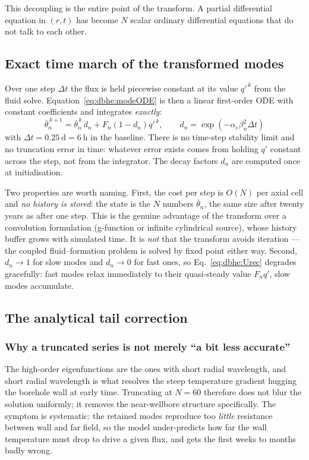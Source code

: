 \documentclass[11pt]{article}
\begin{document}
This decoupling is the entire point of the transform. A partial differential
equation in $(r,t)$ has become $N$ scalar ordinary differential equations that
do not talk to each other.

\subsection{Exact time march of the transformed modes}
\label{sec:dbhe:march}

Over one step $\Delta t$ the flux is held piecewise constant at its value
$q'^{\,k}$ from the fluid solve. Equation~\eqref{eq:dbhe:modeODE} is then a
linear first-order ODE with constant coefficients and integrates \emph{exactly}:
\begin{equation}
\boxed{\; \bar\theta_n^{\,k+1}=\bar\theta_n^{\,k}\,d_n +F_n\left(1-d_n\right)q'^{\,k},
\qquad d_n=\exp\!\left(-\alpha_e\beta_n^{2}\Delta t\right) \; }
\label{eq:dbhe:Urec}
\end{equation}
with $\Delta t=\SI{0.25}{\day}=\SI{6}{\hour}$ in the baseline. There is no
time-step stability limit and no truncation error in time: whatever error exists
comes from holding $q'$ constant across the step, not from the integrator. The
decay factors $d_n$ are computed once at initialisation.

Two properties are worth naming. First, the cost per step is $O(N)$ per axial
cell and \emph{no history is stored}: the state is the $N$ numbers
$\bar\theta_n$, the same size after twenty years as after one step. This is the
genuine advantage of the transform over a convolution formulation (g-function or
infinite cylindrical source), whose history buffer grows with simulated time. It
is \emph{not} that the transform avoids iteration --- the coupled
fluid--formation problem is solved by fixed point either way. Second,
$d_n\to1$ for slow modes and $d_n\to0$ for fast ones, so
Eq.~\eqref{eq:dbhe:Urec} degrades gracefully: fast modes relax immediately to
their quasi-steady value $F_n q'$, slow modes accumulate.

\subsection{The analytical tail correction}
\label{sec:dbhe:tail}

\subsubsection{Why a truncated series is not merely ``a bit less accurate''}
The high-order eigenfunctions are the ones with short radial wavelength, and
short radial wavelength is what resolves the steep temperature gradient hugging
the borehole wall at early time. Truncating at $N=60$ therefore does not blur
the solution uniformly; it removes the near-wellbore structure specifically. The
symptom is systematic: the retained modes reproduce too \emph{little} resistance
between wall and far field, so the model under-predicts how far the wall
temperature must drop to drive a given flux, and gets the first weeks to months
badly wrong.
\end{document}
